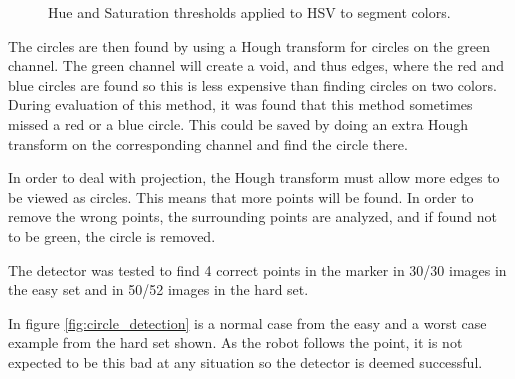 \begin{figure}[h]
\caption{Hue and Saturation thresholds applied to HSV to segment colors.}
\label{fig:hsv_color_segmentation}
\end{figure}

The circles are then found by using a Hough transform for circles on the green channel.
The green channel will create a void, and thus edges, where the red and blue circles are found so this is less expensive than finding circles on two colors.
During evaluation of this method, it was found that this method sometimes missed a red or a blue circle.
This could be saved by doing an extra Hough transform on the corresponding channel and find the circle there.

In order to deal with projection, the Hough transform must allow more edges to be viewed as circles.
This means that more points will be found.
In order to remove the wrong points, the surrounding points are analyzed, and if found not to be green, the circle is removed.

The detector was tested to find 4 correct points in the marker in 30/30 images in the easy set and in 50/52 images in the hard set.

In figure \ref{fig:circle_detection} is a normal case from the easy and a worst case example from the hard set shown.
As the robot follows the point, it is not expected to be this bad at any situation so the detector is deemed successful.

